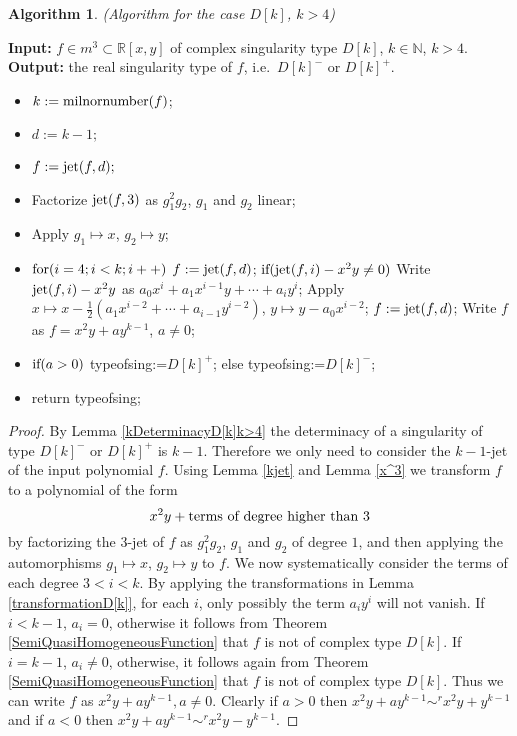 \documentclass{amsproc}
\begin{document}
\newtheorem{D[k]k>4}[kjet]{Algorithm}
\begin{D[k]k>4}(Algorithm for the case $D[k]$, $k>4$)
\end{D[k]k>4}
\noindent\textnormal{\bf Input:} $f\in m^3\subset\mathbb R[x,y]$ of complex singularity type $D[k]$, $k\in\mathbb N$, $k>4$.\newline
\textnormal{\bf Output:} the real singularity type of $f$, i.e.~$D[k]^-$ or $D[k]^+$.
\begin{itemize}
\item $k:= \textnormal{milnornumber}(f)$;
\item $d:=k-1;$
\item $f:=\textnormal{jet}(f,d);$
\item Factorize $\textnormal{jet}(f,3)$ as $g_1^2g_2$, $g_1$ and $g_2$ linear;
\item Apply $g_1\mapsto x$, $g_2\mapsto y$;
\item $\textnormal{for}(i=4;i<k;i++)$\newline
\phantom{}\quad $f:=\textnormal{jet}(f,d)$;\newline
\phantom{}\quad $\textnormal{if}(\textnormal{jet}(f,i)-x^2y\neq0)$\newline
\phantom{}\quad\quad Write $\textnormal{jet}(f,i)-x^2y$ as $a_0x^i+a_1x^{i-1}y+\cdots +a_iy^i$;\newline
\phantom{}\quad\quad Apply $x\mapsto x-\frac{1}{2}(a_1x^{i-2}+\cdots +a_{i-1}y^{i-2})$, $y\mapsto y-a_0x^{i-2}$;\newline
\phantom{}\quad $f:=\textnormal{jet}(f,d)$;\newline
\phantom{}\quad Write $f$ as $f=x^2y+ay^{k-1}$, $a\neq 0$;
\item $\textnormal{if}(a>0)$\newline
\phantom{}\quad typeofsing:=$D[k]^+$;\newline
else\newline
\phantom{}\quad typeofsing:=$D[k]^-$;
\item return typeofsing;
\end{itemize}
\begin{proof}
By Lemma \ref{kDeterminacyD[k]k>4} the determinacy of a singularity of type $D[k]^-$ or $D[k]^+$ is $k-1$. Therefore we only need to consider the $k-1$-jet of the input polynomial $f$. Using Lemma \ref{kjet} and Lemma \ref{x^3} we transform $f$ to a polynomial of the form
\[x^2y+\textnormal{terms of degree higher than $3$}\]
by factorizing the $3$-jet of $f$ as $g_1^2g_2$, $g_1$ and $g_2$ of degree $1$, and then applying the automorphisms $g_1\mapsto x$, $g_2\mapsto y$ to $f$. We now systematically consider the terms of each degree $3<i<k$. By applying the transformations in Lemma \ref{transformationD[k]}, for each $i$, only possibly the term $a_iy^i$ will not vanish. If $i<k-1$, $a_i=0$, otherwise it follows from Theorem \ref{SemiQuasiHomogeneousFunction} that $f$ is not of complex type $D[k]$. If $i=k-1$, $a_i\neq 0$, otherwise, it follows again from Theorem \ref{SemiQuasiHomogeneousFunction} that $f$ is not of complex type $D[k]$. Thus we can write $f$ as $x^2y+ay^{k-1}, a\neq0$. Clearly if $a>0$ then $x^2y+ay^{k-1}\sim^rx^2y+y^{k-1}$ and if $a<0$ then $x^2y+ay^{k-1}\sim^rx^2y-y^{k-1}$.
\end{proof}
\end{document}
